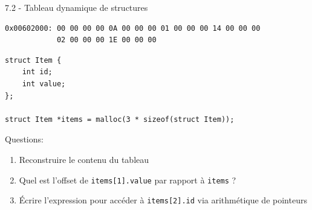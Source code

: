 \documentclass[10pt,a4paper]{article}
\begin{document}
\begin{exercicebox}{7.2 - Tableau dynamique de structures}
\begin{verbatim}
0x00602000: 00 00 00 00 0A 00 00 00 01 00 00 00 14 00 00 00
            02 00 00 00 1E 00 00 00
\end{verbatim}

\begin{lstlisting}
struct Item {
    int id;
    int value;
};

struct Item *items = malloc(3 * sizeof(struct Item));
\end{lstlisting}

Questions:
\begin{enumerate}
\item Reconstruire le contenu du tableau
\item Quel est l'offset de \texttt{items[1].value} par rapport à \texttt{items} ?
\item Écrire l'expression pour accéder à \texttt{items[2].id} via arithmétique de pointeurs
\end{enumerate}
\end{exercicebox}
\end{document}
